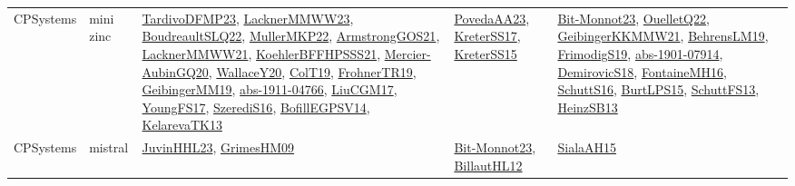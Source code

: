 {\begin{longtable}{lp{3cm}>{\raggedright}p{6cm}>{\raggedright}p{6cm}p{8cm}}
CPSystems & mini zinc & \href{papers/TardivoDFMP23.pdf}{TardivoDFMP23}\cite{TardivoDFMP23}, \href{articles/LacknerMMWW23.pdf}{LacknerMMWW23}\cite{LacknerMMWW23}, \href{papers/BoudreaultSLQ22.pdf}{BoudreaultSLQ22}\cite{BoudreaultSLQ22}, \href{articles/MullerMKP22.pdf}{MullerMKP22}\cite{MullerMKP22}, \href{papers/ArmstrongGOS21.pdf}{ArmstrongGOS21}\cite{ArmstrongGOS21}, \href{papers/LacknerMMWW21.pdf}{LacknerMMWW21}\cite{LacknerMMWW21}, \href{articles/KoehlerBFFHPSSS21.pdf}{KoehlerBFFHPSSS21}\cite{KoehlerBFFHPSSS21}, \href{papers/Mercier-AubinGQ20.pdf}{Mercier-AubinGQ20}\cite{Mercier-AubinGQ20}, \href{articles/WallaceY20.pdf}{WallaceY20}\cite{WallaceY20}, \href{papers/ColT19.pdf}{ColT19}\cite{ColT19}, \href{papers/FrohnerTR19.pdf}{FrohnerTR19}\cite{FrohnerTR19}, \href{papers/GeibingerMM19.pdf}{GeibingerMM19}\cite{GeibingerMM19}, \href{articles/abs-1911-04766.pdf}{abs-1911-04766}\cite{abs-1911-04766}, \href{papers/LiuCGM17.pdf}{LiuCGM17}\cite{LiuCGM17}, \href{papers/YoungFS17.pdf}{YoungFS17}\cite{YoungFS17}, \href{papers/SzerediS16.pdf}{SzerediS16}\cite{SzerediS16}, \href{papers/BofillEGPSV14.pdf}{BofillEGPSV14}\cite{BofillEGPSV14}, \href{papers/KelarevaTK13.pdf}{KelarevaTK13}\cite{KelarevaTK13} & \href{papers/PovedaAA23.pdf}{PovedaAA23}\cite{PovedaAA23}, \href{articles/KreterSS17.pdf}{KreterSS17}\cite{KreterSS17}, \href{papers/KreterSS15.pdf}{KreterSS15}\cite{KreterSS15} & \href{papers/Bit-Monnot23.pdf}{Bit-Monnot23}\cite{Bit-Monnot23}, \href{papers/OuelletQ22.pdf}{OuelletQ22}\cite{OuelletQ22}, \href{papers/GeibingerKKMMW21.pdf}{GeibingerKKMMW21}\cite{GeibingerKKMMW21}, \href{papers/BehrensLM19.pdf}{BehrensLM19}\cite{BehrensLM19}, \href{papers/FrimodigS19.pdf}{FrimodigS19}\cite{FrimodigS19}, \href{articles/abs-1901-07914.pdf}{abs-1901-07914}\cite{abs-1901-07914}, \href{papers/DemirovicS18.pdf}{DemirovicS18}\cite{DemirovicS18}, \href{papers/FontaineMH16.pdf}{FontaineMH16}\cite{FontaineMH16}, \href{papers/SchuttS16.pdf}{SchuttS16}\cite{SchuttS16}, \href{papers/BurtLPS15.pdf}{BurtLPS15}\cite{BurtLPS15}, \href{papers/SchuttFS13.pdf}{SchuttFS13}\cite{SchuttFS13}, \href{articles/HeinzSB13.pdf}{HeinzSB13}\cite{HeinzSB13}\\
CPSystems & mistral & \href{papers/JuvinHHL23.pdf}{JuvinHHL23}\cite{JuvinHHL23}, \href{papers/GrimesHM09.pdf}{GrimesHM09}\cite{GrimesHM09} & \href{papers/Bit-Monnot23.pdf}{Bit-Monnot23}\cite{Bit-Monnot23}, \href{papers/BillautHL12.pdf}{BillautHL12}\cite{BillautHL12} & \href{papers/SialaAH15.pdf}{SialaAH15}\cite{SialaAH15}\\

\end{longtable}}
